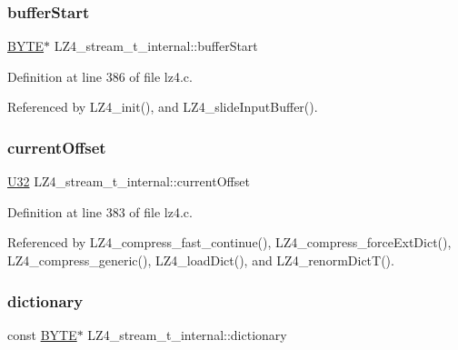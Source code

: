 \subsubsection{\texorpdfstring{buffer\+Start}{bufferStart}}
{\footnotesize\ttfamily \hyperlink{lz4_8c_a4ae1dab0fb4b072a66584546209e7d58}{B\+Y\+TE}$\ast$ L\+Z4\+\_\+stream\+\_\+t\+\_\+internal\+::buffer\+Start}



Definition at line 386 of file lz4.\+c.



Referenced by L\+Z4\+\_\+init(), and L\+Z4\+\_\+slide\+Input\+Buffer().

\mbox{\label{structLZ4__stream__t__internal_a2cdbcab32d03f345fd3c37af43c45523}} 
\subsubsection{\texorpdfstring{current\+Offset}{currentOffset}}
{\footnotesize\ttfamily \hyperlink{lz4_8c_ac3df7cf3c8cb172a588adec881447d68}{U32} L\+Z4\+\_\+stream\+\_\+t\+\_\+internal\+::current\+Offset}



Definition at line 383 of file lz4.\+c.



Referenced by L\+Z4\+\_\+compress\+\_\+fast\+\_\+continue(), L\+Z4\+\_\+compress\+\_\+force\+Ext\+Dict(), L\+Z4\+\_\+compress\+\_\+generic(), L\+Z4\+\_\+load\+Dict(), and L\+Z4\+\_\+renorm\+Dict\+T().

\mbox{\label{structLZ4__stream__t__internal_aea78f571ae3100b95df66b1d39c48aee}} 
\subsubsection{\texorpdfstring{dictionary}{dictionary}}
{\footnotesize\ttfamily const \hyperlink{lz4_8c_a4ae1dab0fb4b072a66584546209e7d58}{B\+Y\+TE}$\ast$ L\+Z4\+\_\+stream\+\_\+t\+\_\+internal\+::dictionary}



